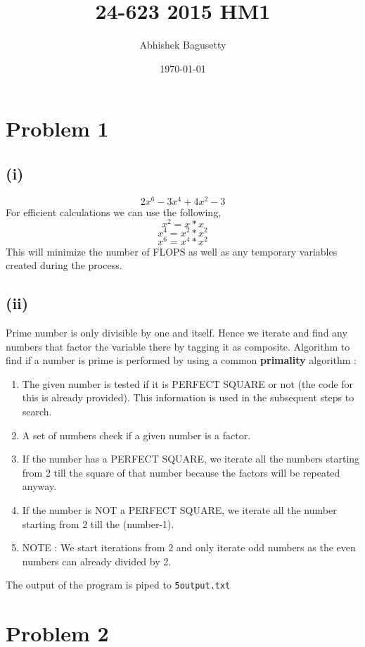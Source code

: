 \documentclass{article}
\author{Abhishek Bagusetty}
\date{\today}
\title{24-623 2015 HM1}
\begin{document}
\maketitle

\section{Problem 1}
\label{sec-1}
\subsection{(i)}
\label{sec-1-1}
$$ 2x^6 - 3x^4 + 4x^2 - 3$$
For efficient calculations we can use the following,
$$  x^2 = x*x$$
$$  x^4 = x^2 * x^2$$
$$  x^6 = x^4 * x^2$$
This will minimize the number of FLOPS as well as any temporary variables created during the process.

\subsection{(ii)}
\label{sec-1-2}
Prime number is only divisible by one and itself. Hence we iterate and find any numbers that factor the variable there by tagging it as composite. Algorithm to find if a number is prime is performed by using a common \textbf{primality} algorithm :

\begin{enumerate}
\item The given number is tested if it is PERFECT SQUARE or not (the code for this is already provided). This information is used in the subsequent steps to search.
\item A set of numbers check if a given number is a factor.
\item If the number has a PERFECT SQUARE, we iterate all the numbers starting from 2 till the square of that number because the factors will be repeated anyway.
\item If the number is NOT a PERFECT SQUARE, we iterate all the number starting from 2 till the (number-1).
\item NOTE : We start iterations from 2 and only iterate odd numbers as the even numbers can already divided by 2.
\end{enumerate}

The output of the program is piped to \texttt{5output.txt}

\section{Problem 2}
\label{sec-2}
\end{document}
